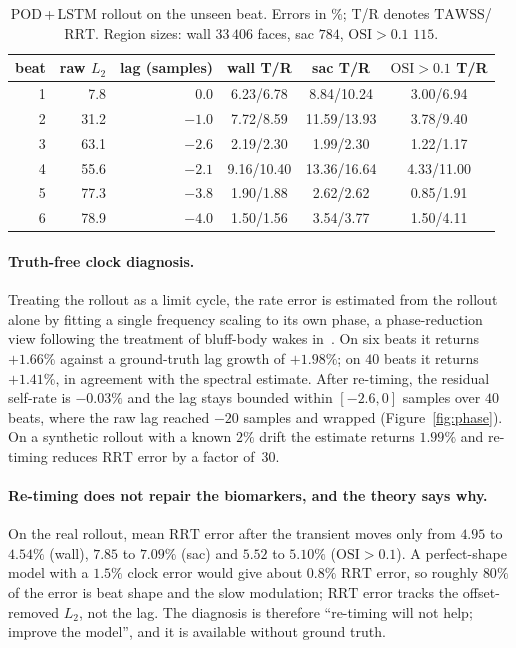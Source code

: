 \documentclass[11pt,a4paper]{article}
\newcommand{\TAWSS}{\mathrm{TAWSS}}
\newcommand{\OSI}{\mathrm{OSI}}
\newcommand{\RRT}{\mathrm{RRT}}
\begin{document}
\begin{table}[t]
\centering
\caption{POD\,+\,LSTM rollout on the unseen beat. Errors in \%; T/R denotes
$\TAWSS$/$\RRT$. Region sizes: wall $33\,406$ faces, sac $784$,
$\OSI>0.1$ $115$.}
\label{tab:lstm}
\begin{tabular}{r r r c c c}
\toprule
beat & raw $L_2$ & lag (samples) & wall T/R & sac T/R & $\OSI>0.1$ T/R\\
\midrule
1 & 7.8 & 0.0 & 6.23/6.78 & 8.84/10.24 & 3.00/6.94\\
2 & 31.2 & $-1.0$ & 7.72/8.59 & 11.59/13.93 & 3.78/9.40\\
3 & 63.1 & $-2.6$ & 2.19/2.30 & 1.99/2.30 & 1.22/1.17\\
4 & 55.6 & $-2.1$ & 9.16/10.40 & 13.36/16.64 & 4.33/11.00\\
5 & 77.3 & $-3.8$ & 1.90/1.88 & 2.62/2.62 & 0.85/1.91\\
6 & 78.9 & $-4.0$ & 1.50/1.56 & 3.54/3.77 & 1.50/4.11\\
\bottomrule
\end{tabular}
\end{table}

\paragraph{Truth-free clock diagnosis.}
Treating the rollout as a limit cycle, the rate error is estimated from the
rollout alone by fitting a single frequency scaling to its own phase, a
phase-reduction view following the treatment of bluff-body wakes
in~\cite{samanta2026}. On six beats it returns $+1.66\%$ against a
ground-truth lag growth of $+1.98\%$; on $40$ beats it returns $+1.41\%$, in
agreement with the spectral estimate. After re-timing, the residual
self-rate is $-0.03\%$ and the lag stays bounded within $[-2.6,0]$ samples
over $40$ beats, where the raw lag reached $-20$ samples and wrapped
(Figure~\ref{fig:phase}). On a synthetic rollout with a known $2\%$ drift the
estimate returns $1.99\%$ and re-timing reduces $\RRT$ error by a factor
of~$30$.

\paragraph{Re-timing does not repair the biomarkers, and the theory says why.}
On the real rollout, mean $\RRT$ error after the transient moves only from
$4.95$ to $4.54\%$ (wall), $7.85$ to $7.09\%$ (sac) and $5.52$ to $5.10\%$
($\OSI>0.1$). A perfect-shape model with a $1.5\%$ clock error would give
about $0.8\%$ $\RRT$ error, so roughly $80\%$ of the error is beat shape and
the slow modulation; $\RRT$ error tracks the offset-removed $L_2$, not the
lag. The diagnosis is therefore ``re-timing will not help; improve the
model'', and it is available without ground truth.
\end{document}
